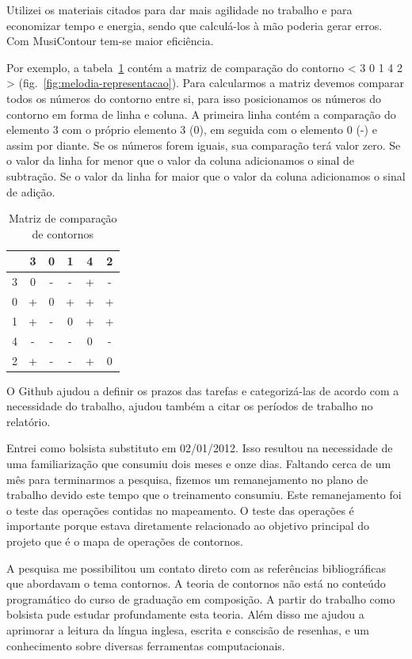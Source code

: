 \documentclass[11pt]{article}
\begin{document}
Utilizei os materiais citados para dar mais agilidade no trabalho e
para economizar tempo e energia, sendo que calculá-los à mão poderia
gerar erros. Com MusiContour tem-se maior eficiência.

Por exemplo, a tabela~\ref{tab:matriz-comparacao-contornos} contém a
matriz de comparação do contorno < 3 0 1 4 2 >
(fig.~\ref{fig:melodia-representacao}). Para calcularmos a matriz
devemos comparar todos os números do contorno entre si, para isso
posicionamos os números do contorno em forma de linha e coluna. A
primeira linha contém a comparação do elemento 3 com o próprio
elemento 3 (0), em seguida com o elemento 0 (-) e assim por diante. Se
os números forem iguais, sua comparação terá valor zero. Se o valor da
linha for menor que o valor da coluna adicionamos o sinal de
subtração. Se o valor da linha for maior que o valor da coluna
adicionamos o sinal de adição.

\begin{table}
  \centering
  \begin{tabular}{c|ccccc}
    &3&0&1&4&2\\
    \hline
    3&0&-&-&+&-\\
    0&+&0&+&+&+\\
    1&+&-&0&+&+\\
    4&-&-&-&0&-\\
    2&+&-&-&+&0\\
  \end{tabular}
  \caption{Matriz de comparação de contornos}
  \label{tab:matriz-comparacao-contornos}
\end{table}

O Github ajudou a definir os prazos das tarefas e categorizá-las de
acordo com a necessidade do trabalho, ajudou também a citar os
períodos de trabalho no relatório.


Entrei como bolsista substituto em 02/01/2012. Isso resultou na
necessidade de uma familiarização que consumiu dois meses e onze dias.
Faltando cerca de um mês para terminarmos a pesquisa, fizemos um
remanejamento no plano de trabalho devido este tempo que o treinamento
consumiu. Este remanejamento foi o teste das operações contidas no
mapeamento. O teste das operações é importante porque estava
diretamente relacionado ao objetivo principal do projeto que é o mapa
de operações de contornos.

A pesquisa me possibilitou um contato direto com as referências
bibliográficas que abordavam o tema contornos.  A teoria de contornos
não está no conteúdo programático do curso de graduação em composição.
A partir do trabalho como bolsista pude estudar profundamente esta
teoria.  Além disso me ajudou a aprimorar a leitura da língua inglesa,
escrita e conscisão de resenhas, e um conhecimento sobre diversas
ferramentas computacionais.
\end{document}
